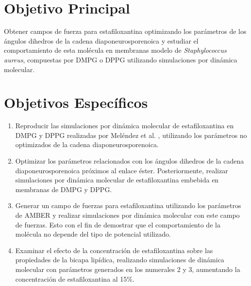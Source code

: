 \section{Objetivo Principal}
Obtener campos de fuerza para estafiloxantina optimizando los parámetros de los ángulos dihedros de la cadena diaponeurosporenoica y estudiar el comportamiento de esta molécula en membranas modelo de \textit{Staphylococcus aureus}, compuestas por DMPG o DPPG utilizando simulaciones por dinámica molecular.
\section{Objetivos Específicos}
\begin{enumerate}
\item Reproducir las simulaciones por dinámica molecular de estafiloxantina en DMPG y DPPG realizadas  por Meléndez et al. \cite{MelendezDelgado2018StudyingBilayers}, utilizando los parámetros no optimizados de la cadena diaponeurosporenoica.
\item Optimizar los parámetros relacionados  con los ángulos dihedros de la cadena diaponeurosporenoica próximos al enlace éster. Posteriormente, realizar simulaciones por dinámica molecular de estafiloxantina embebida en membranas de DMPG y DPPG.
\item Generar un campo de fuerzas para estafiloxantina utilizando los parámetros de AMBER y realizar simulaciones por dinámica molecular con este campo de fuerzas. Esto con el fin de demostrar que el comportamiento de la molécula no depende del tipo de potencial utilizado.
\item Examinar el efecto de la concentración de estafiloxantina sobre las propiedades de la bicapa lipídica, realizando simulaciones de dinámica molecular con parámetros generados en los numerales 2 y 3, aumentando  la concentración de estafiloxantina al 15\%.
\end{enumerate}

